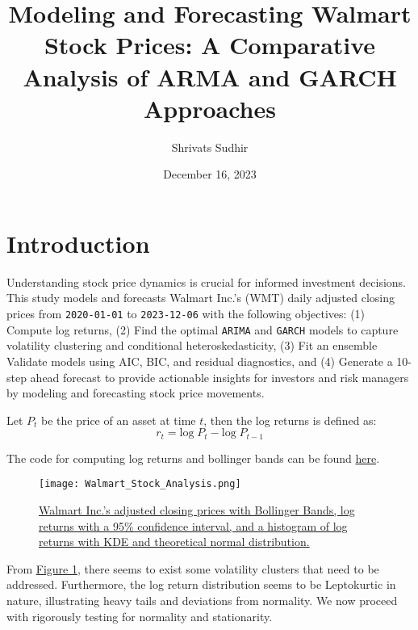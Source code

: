 \documentclass{article}
\newcommand{\1}{\mathbbm{1}}
\theoremstyle{definition}
\begin{document}
\title{\textbf{
    Modeling and Forecasting Walmart Stock Prices: A Comparative Analysis of ARMA and GARCH Approaches
}}

\author{Shrivats Sudhir}
\date{December 16, 2023}

\begin{titlingpage}
\maketitle
\end{titlingpage}

\newpage
\tableofcontents
\newpage

\section{Introduction}

Understanding stock price dynamics is crucial for informed investment decisions. This study models and forecasts Walmart Inc.'s (WMT) daily adjusted closing prices from \texttt{2020-01-01} to \texttt{2023-12-06} with the following objectives: (1) Compute log returns, (2) Find the optimal \texttt{ARIMA} and \texttt{GARCH} models to capture volatility clustering and conditional heteroskedasticity, (3) Fit an ensemble Validate models using AIC, BIC, and residual diagnostics, and (4) Generate a 10-step ahead forecast to provide actionable insights for investors and risk managers by modeling and forecasting stock price movements.

Let $P_t$ be the price of an asset at time $t$, then the log returns is defined as:
$$r_t = \text{log}\;P_t - \text{log}\;P_{t-1}$$

The code for computing log returns and bollinger bands can be found \hyperref[subsec:loading_data]{here}. 

\begin{figure}[H]
\centering
\texttt{[image: Walmart\_Stock\_Analysis.png]}
\caption{\small{\hyperref[subsec:adjclose_adjreturns_plot]{Walmart Inc.'s adjusted closing prices with Bollinger Bands, log returns with a 95\% confidence interval, and a histogram of log returns with KDE and theoretical normal distribution.}}}
\label{fig:adjclose_adjreturns_plot}
\end{figure}

From \hyperref[fig:adjclose_adjreturns_plot]{Figure \ref{fig:adjclose_adjreturns_plot}}, there seems to exist some volatility clusters that need to be addressed. Furthermore, the log return distribution seems to be Leptokurtic in nature, illustrating heavy tails and deviations from normality. We now proceed with rigorously testing for normality and stationarity.
\end{document}

